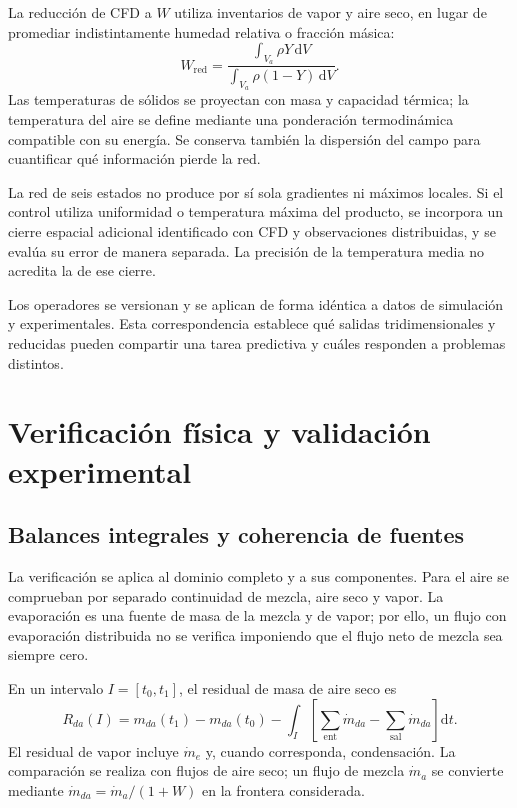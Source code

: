 La reducción de CFD a $W$ utiliza inventarios de vapor y aire seco, en lugar de promediar indistintamente humedad relativa o fracción másica:
\begin{equation}
W_{\mathrm{red}}=
\frac{\int_{V_a}\rho Y\,\mathrm dV}
{\int_{V_a}\rho(1-Y)\,\mathrm dV}.
\label{met:proyeccion_W}
\end{equation}
Las temperaturas de sólidos se proyectan con masa y capacidad térmica; la temperatura del aire se define mediante una ponderación termodinámica compatible con su energía. Se conserva también la dispersión del campo para cuantificar qué información pierde la red.

La red de seis estados no produce por sí sola gradientes ni máximos locales. Si el control utiliza uniformidad o temperatura máxima del producto, se incorpora un cierre espacial adicional identificado con CFD y observaciones distribuidas, y se evalúa su error de manera separada. La precisión de la temperatura media no acredita la de ese cierre.

Los operadores se versionan y se aplican de forma idéntica a datos de simulación y experimentales. Esta correspondencia establece qué salidas tridimensionales y reducidas pueden compartir una tarea predictiva y cuáles responden a problemas distintos.

\section{Verificación física y validación experimental}
\label{met:validacion}

\subsection{Balances integrales y coherencia de fuentes}
\label{met:conservacion}

La verificación se aplica al dominio completo y a sus componentes. Para el aire se comprueban por separado continuidad de mezcla, aire seco y vapor. La evaporación es una fuente de masa de la mezcla y de vapor; por ello, un flujo con evaporación distribuida no se verifica imponiendo que el flujo neto de mezcla sea siempre cero.

En un intervalo $I=[t_0,t_1]$, el residual de masa de aire seco es
\begin{equation}
R_{da}(I)=m_{da}(t_1)-m_{da}(t_0)
-\int_I\left[
\sum_{\mathrm{ent}}\dot m_{da}
-\sum_{\mathrm{sal}}\dot m_{da}
\right]\mathrm dt.
\label{met:residual_aire_seco}
\end{equation}
El residual de vapor incluye $\dot m_e$ y, cuando corresponda, condensación. La comparación se realiza con flujos de aire seco; un flujo de mezcla $\dot m_a$ se convierte mediante $\dot m_{da}=\dot m_a/(1+W)$ en la frontera considerada.

